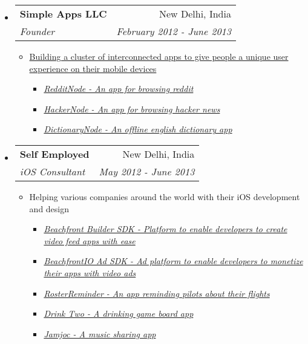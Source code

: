 \documentclass[letterpaper,11pt]{article}
\makeatletter
\newcommand{\resitem}[1]{\item #1 \vspace{-2pt}}
\newcommand{\ressubheading}[4]{
\begin{tabular*}{7.0in}{l@{\extracolsep{\fill}}r}
    \textbf{#1} & #2 \\
    \textit{#3} & \textit{#4} \\
\end{tabular*}\vspace{-6pt}}
\makeatother
\begin{document}
\begin{itemize}
\item
    \ressubheading{Simple Apps LLC}{New Delhi, India}{Founder}{February 2012 - June 2013}
    \begin{itemize}
        \resitem{\href{http://www.nodemesh.net}{Building a cluster of interconnected apps to give people a unique user experience on their mobile devices}}
        \begin{itemize}
           \resitem{\href{https://itunes.apple.com/ca/app/redditnode/id555533903?mt=8}{\emph{RedditNode - An app for browsing reddit}}}
            \resitem{\href{https://itunes.apple.com/ca/app/hackernode/id473882597?mt=8}{\emph{HackerNode - An app for browsing hacker news}}}
            \resitem{\href{https://itunes.apple.com/ca/app/dictionarynode/id538492050?mt=8}{\emph{DictionaryNode - An offline english dictionary app}}}
        \end{itemize}
    \end{itemize}

\item
    \ressubheading{{Self Employed}}{New Delhi, India}{iOS Consultant}{May 2012 - June 2013}
    \begin{itemize}
        \resitem{Helping various companies around the world with their iOS development and design}
        \begin{itemize}
           \resitem{\href{https://github.com/beachfront/videosdk-ios}{\emph{Beachfront Builder SDK - Platform to enable developers to create video feed apps with ease}}}
          \resitem{\href{https://github.com/beachfront/beachfront-io-ios-sdk}{\emph{BeachfrontIO Ad SDK - Ad platform to enable developers to monetize their apps with video ads}}}
           \resitem{\href{https://itunes.apple.com/us/app/sg-pilots-roster-reminder/id561001503}{\emph{RosterReminder - An app reminding pilots about their flights}}}
            \resitem{\href{https://itunes.apple.com/tr/app/drink-two-college-party-drinking/id590014833?mt=8}{\emph{Drink Two - A drinking game board app}}}
            \resitem{\href{https://itunes.apple.com/us/app/earhead/id585869906?mt=8}{\emph{Jamjoc - A music sharing app}}}
        \end{itemize}
    \end{itemize}

\vspace{0.5in}


\end{itemize}
\end{document}
